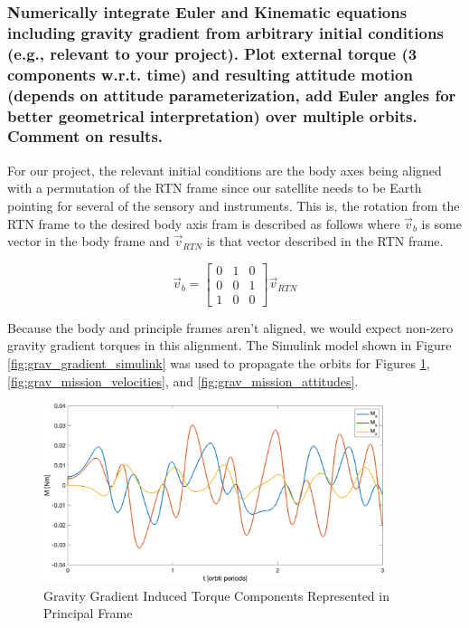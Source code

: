 \subsubsection{Numerically integrate Euler and Kinematic equations including gravity gradient from arbitrary initial conditions (e.g., relevant to your project). Plot external torque (3 components w.r.t. time)
and resulting attitude motion (depends on attitude parameterization, add Euler angles for better
geometrical interpretation) over multiple orbits. Comment on results.}

For our project, the relevant initial conditions are the body axes being aligned with a permutation of the RTN frame since our satellite needs to be Earth pointing for several of the sensory and instruments. This is, the rotation from the RTN frame to the desired body axis fram is described as follows where $\vec{v}_b$ is some vector in the body frame and $\vec{v}_{RTN}$ is that vector described in the RTN frame.

\begin{equation*}
    \vec{v}_b = \begin{bmatrix}
        0 & 1 & 0 \\ 0 & 0 & 1 \\ 1 & 0 & 0
    \end{bmatrix} \vec{v}_{RTN}
\end{equation*}

Because the body and principle frames aren't aligned, we would expect non-zero gravity gradient torques in this alignment. The Simulink model shown in Figure \ref{fig:grav_gradient_simulink} was used to propagate the orbits for Figures \ref{fig:gravity_gradienet_mission_aligned}, \ref{fig:grav_mission_velocities}, and \ref{fig:grav_mission_attitudes}.

\begin{figure}[H]
    \centering
    \captionsetup{ justification = centering}
    \includegraphics[width = 10cm]{Images/PS4/gravity_torque_mission_aligned.png}
    \caption{Gravity Gradient Induced Torque Components Represented in Principal Frame}
    \label{fig:gravity_gradienet_mission_aligned}
\end{figure}

